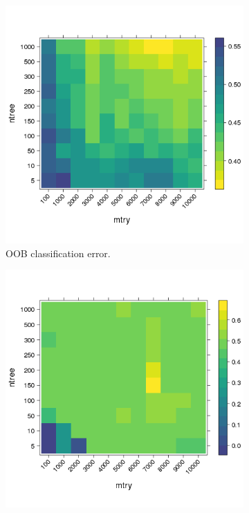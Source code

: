 \documentclass[10pt,letterpaper]{article}
\begin{document}
\begin{figure}[tbhp] 
  \begin{adjustwidth}{-1.00in}{0in}
    \caption{\textbf{Out of bag classification error and rank-biased-overlap estimates}} 
    \label{figure:synth1}
    \begin{subfigure}[b]{0.5\linewidth}
      \centering
      \includegraphics[totalheight=8cm]{./figs/out-of-bag-prediction-error.png}
      \caption{OOB classification error.} 
      \label{figure:out-of-bag-prediction-error-prod.png} 
      \vspace{4ex}
    \end{subfigure} 
    \begin{subfigure}[b]{0.5\linewidth}
      \centering
      \includegraphics[totalheight=8cm]{./figs/rbo.png}

\end{subfigure}
\end{adjustwidth}
\end{figure}
\end{document}
